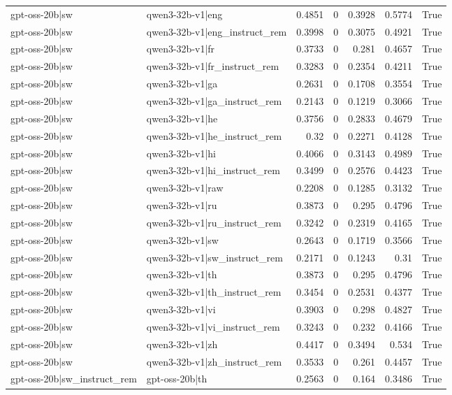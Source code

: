 \begin{table}
\begin{tabular}{l l r r r r l}
gpt-oss-20b|sw & qwen3-32b-v1|eng & 0.4851 & 0 & 0.3928 & 0.5774 & True \\
gpt-oss-20b|sw & qwen3-32b-v1|eng_instruct_rem & 0.3998 & 0 & 0.3075 & 0.4921 & True \\
gpt-oss-20b|sw & qwen3-32b-v1|fr & 0.3733 & 0 & 0.281 & 0.4657 & True \\
gpt-oss-20b|sw & qwen3-32b-v1|fr_instruct_rem & 0.3283 & 0 & 0.2354 & 0.4211 & True \\
gpt-oss-20b|sw & qwen3-32b-v1|ga & 0.2631 & 0 & 0.1708 & 0.3554 & True \\
gpt-oss-20b|sw & qwen3-32b-v1|ga_instruct_rem & 0.2143 & 0 & 0.1219 & 0.3066 & True \\
gpt-oss-20b|sw & qwen3-32b-v1|he & 0.3756 & 0 & 0.2833 & 0.4679 & True \\
gpt-oss-20b|sw & qwen3-32b-v1|he_instruct_rem & 0.32 & 0 & 0.2271 & 0.4128 & True \\
gpt-oss-20b|sw & qwen3-32b-v1|hi & 0.4066 & 0 & 0.3143 & 0.4989 & True \\
gpt-oss-20b|sw & qwen3-32b-v1|hi_instruct_rem & 0.3499 & 0 & 0.2576 & 0.4423 & True \\
gpt-oss-20b|sw & qwen3-32b-v1|raw & 0.2208 & 0 & 0.1285 & 0.3132 & True \\
gpt-oss-20b|sw & qwen3-32b-v1|ru & 0.3873 & 0 & 0.295 & 0.4796 & True \\
gpt-oss-20b|sw & qwen3-32b-v1|ru_instruct_rem & 0.3242 & 0 & 0.2319 & 0.4165 & True \\
gpt-oss-20b|sw & qwen3-32b-v1|sw & 0.2643 & 0 & 0.1719 & 0.3566 & True \\
gpt-oss-20b|sw & qwen3-32b-v1|sw_instruct_rem & 0.2171 & 0 & 0.1243 & 0.31 & True \\
gpt-oss-20b|sw & qwen3-32b-v1|th & 0.3873 & 0 & 0.295 & 0.4796 & True \\
gpt-oss-20b|sw & qwen3-32b-v1|th_instruct_rem & 0.3454 & 0 & 0.2531 & 0.4377 & True \\
gpt-oss-20b|sw & qwen3-32b-v1|vi & 0.3903 & 0 & 0.298 & 0.4827 & True \\
gpt-oss-20b|sw & qwen3-32b-v1|vi_instruct_rem & 0.3243 & 0 & 0.232 & 0.4166 & True \\
gpt-oss-20b|sw & qwen3-32b-v1|zh & 0.4417 & 0 & 0.3494 & 0.534 & True \\
gpt-oss-20b|sw & qwen3-32b-v1|zh_instruct_rem & 0.3533 & 0 & 0.261 & 0.4457 & True \\
gpt-oss-20b|sw_instruct_rem & gpt-oss-20b|th & 0.2563 & 0 & 0.164 & 0.3486 & True \\

\end{tabular}
\end{table}
